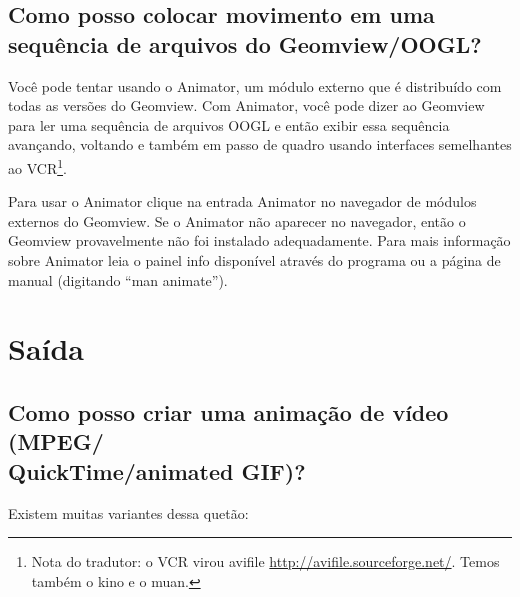 \documentclass[12pt,a4paper]{article}
\begin{document}
    \subsection{Como posso colocar movimento em uma sequ\^encia de arquivos do Geomview/OOGL?}

        Voc\^e pode tentar usando o Animator, um m\'{o}dulo externo que \'e distribu\'ido
        com todas as vers\~oes do Geomview. Com Animator, voc\^e pode dizer ao Geomview para
        ler uma sequ\^encia de arquivos OOGL e ent\~ao exibir essa sequ\^encia
        avan\c{c}ando, voltando e tamb\'em em passo de quadro usando interfaces semelhantes ao
        VCR\footnote{Nota do tradutor: o VCR virou avifile \url{http://avifile.sourceforge.net/}.
        Temos tamb\'em o kino e o muan.}.

        Para usar o Animator clique na entrada Animator no navegador de m\'{o}dulos externos
        do Geomview. Se o Animator n\~ao aparecer no navegador, ent\~ao o Geomview
        provavelmente n\~ao foi instalado adequadamente. Para mais informa\c{c}\~ao sobre
        Animator leia o painel info dispon\'ivel atrav\'es do programa ou a
        p\'agina de manual (digitando ``man animate'').

\section{Sa\'ida}

    \subsection{Como posso criar uma anima\c{c}\~ao de v\'ideo (MPEG/\\ QuickTime/animated GIF)?}

Existem muitas variantes dessa quet\~ao:
\end{document}
